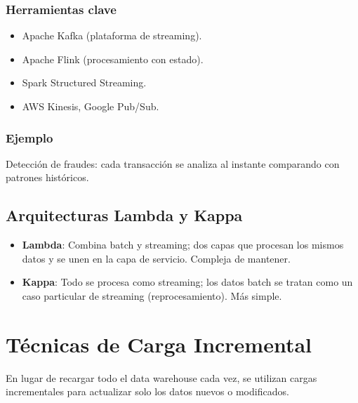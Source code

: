 \documentclass[12pt,a4paper,openany,oneside]{book}
\begin{document}
\subsection{Herramientas clave}
\begin{itemize}
    \item Apache Kafka (plataforma de streaming).
    \item Apache Flink (procesamiento con estado).
    \item Spark Structured Streaming.
    \item AWS Kinesis, Google Pub/Sub.
\end{itemize}
\subsection{Ejemplo}
Detección de fraudes: cada transacción se analiza al instante comparando con patrones históricos.

\section{Arquitecturas Lambda y Kappa}
\begin{itemize}
    \item \textbf{Lambda}: Combina batch y streaming; dos capas que procesan los mismos datos y se unen en la capa de servicio. Compleja de mantener.
    \item \textbf{Kappa}: Todo se procesa como streaming; los datos batch se tratan como un caso particular de streaming (reprocesamiento). Más simple.
\end{itemize}

\begin{center}
\caption{Arquitectura Lambda}
\end{center}

\chapter{Técnicas de Carga Incremental}
En lugar de recargar todo el data warehouse cada vez, se utilizan cargas incrementales para actualizar solo los datos nuevos o modificados.
\end{document}
